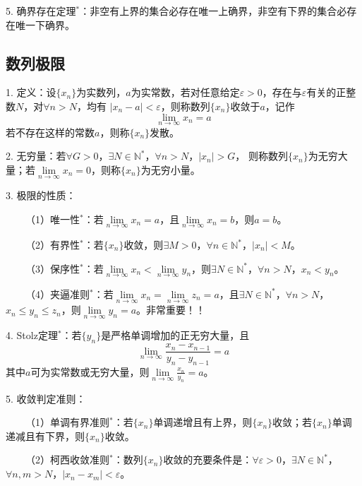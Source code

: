5. 确界存在定理$^*$：非空有上界的集合必存在唯一上确界，非空有下界的集合必存在唯一下确界。

\subsection{数列极限}


1. 定义：设$\{x_n\}$为实数列，$a$为实常数，若对任意给定$\varepsilon>0$，存在与$\varepsilon$有关的正整数$N$，对$\forall n>N$，均有
$\left|x_n-a\right|<\varepsilon$，则称数列$\{x_n\}$收敛于$a$，记作
\begin{equation*}
    \lim\limits_{n\rightarrow \infty}x_n=a
\end{equation*}
若不存在这样的常数$a$，则称$\{x_n\}$发散。

2. 无穷量：若$\forall G>0$，$\exists N \in \mathbb{N}^*$，$\forall n>N$，$\left|x_n \right|>G$，
则称数列$\{x_n\}$为无穷大量；若$\lim\limits_{n\rightarrow \infty}x_n=0$，则称$\{x_n\}$为无穷小量。

3. 极限的性质：

~~~~（1）唯一性$^*$：若$\lim\limits_{n\rightarrow \infty}x_n=a$，且$\lim\limits_{n\rightarrow \infty}x_n=b$，则$a=b$。

~~~~（2）有界性$^*$：若$\{x_n\}$收敛，则$\exists M >0$，$\forall n \in \mathbb{N}^*$，$\left|x_n\right|<M$。

~~~~（3）保序性$^*$：若$\lim\limits_{n\rightarrow \infty}x_n<\lim\limits_{n\rightarrow \infty}y_n$，则$\exists N\in \mathbb{N}^*$，$\forall n>N$，$x_n<y_n$。

~~~~（4）夹逼准则$^*$：若$\lim\limits_{n\rightarrow \infty}x_n=\lim\limits_{n\rightarrow \infty}z_n=a$，且$\exists N \in \mathbb{N}^*$，$\forall n>N$，$x_n\leqslant y_n\leqslant z_n$，则$\lim\limits_{n\rightarrow \infty}y_n=a$。非常重要！！

4. Stolz定理$^*$：若$\{y_n\}$是严格单调增加的正无穷大量，且
\begin{equation*}
    \lim\limits_{n\rightarrow \infty} \frac{x_n-x_{n-1}}{y_n-y_{n-1}}=a
\end{equation*}
其中$a$可为实常数或无穷大量，则$\lim\limits_{n\rightarrow \infty}\frac{x_n}{y_n}=a$。

5. 收敛判定准则：

~~~~（1）单调有界准则$^*$：若$\{x_n\}$单调递增且有上界，则$\{x_n\}$收敛；若$\{x_n\}$单调递减且有下界，则$\{x_n\}$收敛。

~~~~（2）柯西收敛准则$^*$：数列$\{x_n\}$收敛的充要条件是：$\forall \varepsilon>0$，$\exists N\in \mathbb{N}^*$，$\forall n,m>N$，$\left|x_n-x_m\right|<\varepsilon$。

